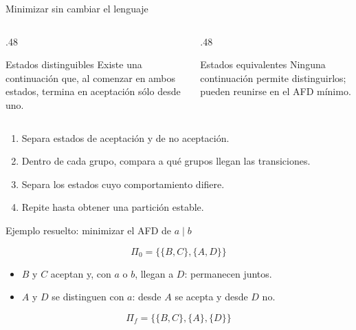 \documentclass[11pt,spanish]{beamer}
\begin{document}
\begin{frame}{Minimizar sin cambiar el lenguaje}
\vfill

\begin{columns}[T,onlytextwidth]
\begin{column}{.48\textwidth}
\begin{block}{Estados distinguibles}
\small Existe una continuación que, al comenzar en ambos estados, termina en aceptación sólo desde uno.
\end{block}
\end{column}
\begin{column}{.48\textwidth}
\begin{block}{Estados equivalentes}
\small Ninguna continuación permite distinguirlos; pueden reunirse en el AFD mínimo.
\end{block}
\end{column}
\end{columns}

\bigskip
\begin{enumerate}
\item Separa estados de aceptación y de no aceptación.
\item Dentro de cada grupo, compara a qué grupos llegan las transiciones.
\item Separa los estados cuyo comportamiento difiere.
\item Repite hasta obtener una partición estable.
\end{enumerate}

\vfill
\end{frame}

\begin{frame}{Ejemplo resuelto: minimizar el AFD de \(a\mid b\)}
\vfill

\[
\Pi_0=\big\{\{B,C\},\{A,D\}\big\}
\]

\begin{itemize}
\item \(B\) y \(C\) aceptan y, con \(a\) o \(b\), llegan a \(D\): permanecen juntos.
\item \(A\) y \(D\) se distinguen con \(a\): desde \(A\) se acepta y desde \(D\) no.
\end{itemize}

\[
\Pi_f=\big\{\{B,C\},\{A\},\{D\}\big\}
\]

\begin{center}
\end{center}

\vfill
\end{frame}
\end{document}
